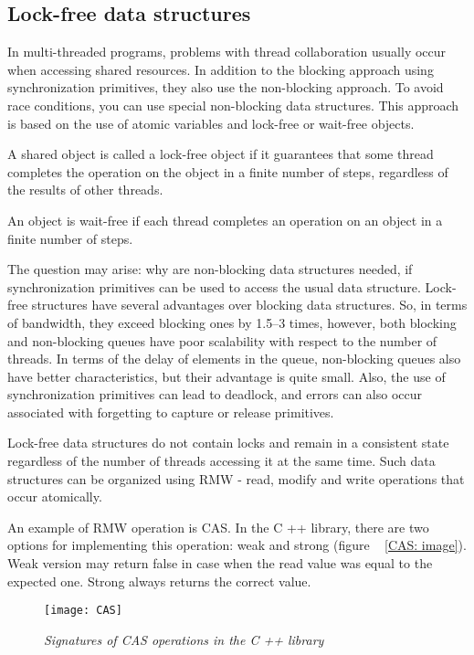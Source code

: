 { %
	\subsection{Lock-free data structures}
	\label{lockfree:section}
	\par In multi-threaded programs, problems with thread collaboration usually occur when accessing shared resources. In addition to the blocking approach using synchronization primitives, they also use the non-blocking approach. To avoid race conditions, you can use special non-blocking data structures. This approach is based on the use of atomic variables and lock-free or wait-free objects.
	\par A shared object is called a lock-free object if it guarantees that some thread completes the operation on the object in a finite number of steps, regardless of the results of other threads.
	\par An object is wait-free if each thread completes an operation on an object in a finite number of steps.
	\par The question may arise: why are non-blocking data structures needed, if synchronization primitives can be used to access the usual data structure. Lock-free structures have several advantages over blocking data structures. So, in terms of bandwidth, they exceed blocking ones by 1.5–3 times, however, both blocking and non-blocking queues have poor scalability with respect to the number of threads. In terms of the delay of elements in the queue, non-blocking queues also have better characteristics, but their advantage is quite small. Also, the use of synchronization primitives can lead to deadlock, and errors can also occur associated with forgetting to capture or release primitives.
	\par Lock-free data structures do not contain locks and remain in a consistent state regardless of the number of threads accessing it at the same time. Such data structures can be organized using RMW - read, modify and write operations that occur atomically.
	\par An example of RMW operation is CAS. In the C ++ library, there are two options for implementing this operation: weak and strong (figure ~ \ref{CAS: image}). Weak version may return false in case when the read value was equal to the expected one. Strong always returns the correct value.
	\begin{figure}[H]
		\texttt{[image: CAS]}
		\caption{\textit{Signatures of CAS operations in the C ++ library}}

\end{figure}}
